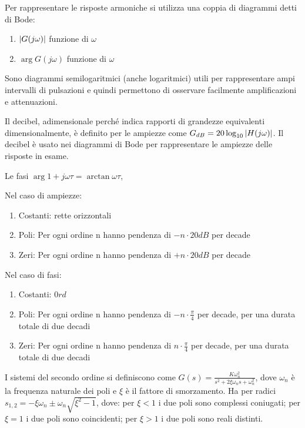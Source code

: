 Per rappresentare le risposte armoniche si utilizza una coppia di diagrammi detti di Bode:
\begin{enumerate}
    \item $\left|G(j\omega)\right|$ funzione di $\omega$
    \item $\arg{G(j\omega)}$ funzione di $\omega$
\end{enumerate}

Sono diagrammi semilogaritmici (anche logaritmici) utili per rappresentare ampi intervalli di pulsazioni e quindi permettono di osservare facilmente amplificazioni e attenuazioni.

Il decibel, adimensionale perché indica rapporti di grandezze equivalenti dimensionalmente, è definito per le ampiezze come $G_{dB} = 20\log_{10}{\left|H(j\omega)\right|}$. Il decibel è usato nei diagrammi di Bode per rappresentare le ampiezze delle risposte in esame.

Le fasi $\arg{1+j\omega \tau}=\arctan{\omega \tau}$, 

Nel caso di ampiezze:
\begin{enumerate}
    \item Costanti: rette orizzontali
    \item Poli: Per ogni ordine n hanno pendenza di $-n\cdot 20dB$ per decade 
    \item Zeri: Per ogni ordine n hanno pendenza di $+n\cdot 20dB$ per decade
\end{enumerate}

Nel caso di fasi:
\begin{enumerate}
    \item Costanti: $0 rd$
    \item Poli: Per ogni ordine n hanno pendenza di $-n\cdot \frac{\pi}{4}$ per decade, per una durata totale di due decadi
    \item Zeri: Per ogni ordine n hanno pendenza di $n\cdot \frac{\pi}{4}$ per decade, per una durata totale di due decadi
\end{enumerate}

 \label{sistemi_ordine_2}
I sistemi del secondo ordine si definiscono come \(G(s)=\frac{K \omega_n^2}{s^2+2\xi\omega_n s +\omega_n^2}\), dove \(\omega_n\) è la frequenza naturale dei poli e  \(\xi\) è il fattore di smorzamento. Ha per radici 
\(s_{1,2}=-\xi \omega_n \pm \omega_n\sqrt{\xi^2-1}\), dove: per \(\xi < 1\) i due poli sono complessi coniugati; per \(\xi = 1\) i due poli sono coincidenti; per \(\xi > 1\) i due poli sono reali distinti.

